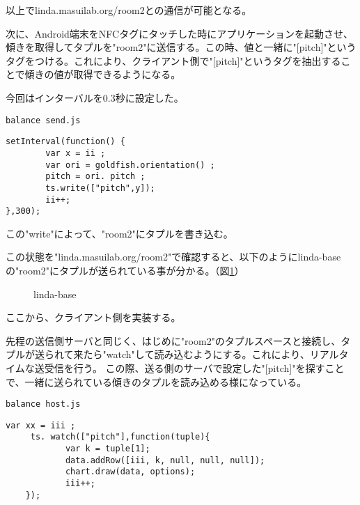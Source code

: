 \hspace{30mm} 

以上でlinda.masuilab.org/room2との通信が可能となる。


次に、Android端末をNFCタグにタッチした時にアプリケーションを起動させ、傾きを取得してタプルを"room2"に送信する。この時、値と一緒に"[pitch]"というタグをつける。これにより、クライアント側で"[pitch]"というタグを抽出することで傾きの値が取得できるようになる。

今回はインターバルを0.3秒に設定した。


\begin{itembox}[l]{{\tt balance send.js}}
\begin{verbatim}
setInterval(function() {
        var x = ii ;
        var ori = goldfish.orientation() ;
        pitch = ori. pitch ;
        ts.write(["pitch",y]); 
        ii++;
},300); 
\end{verbatim}
\end{itembox}

\hspace{30mm}

この"write"によって、"room2"にタプルを書き込む。

この状態を"linda.masuilab.org/room2"で確認すると、以下のようにlinda-baseの"room2"にタプルが送られている事が分かる。（図\ref{fig:08}）
\hspace{30mm}

\begin{figure}[htbp]
    \begin{center}
    \end{center}
    \caption{linda-base}
    \label{fig:08}
\end{figure}




ここから、クライアント側を実装する。

先程の送信側サーバと同じく、はじめに"room2"のタプルスペースと接続し、タプルが送られて来たら"watch"して読み込むようにする。これにより、リアルタイムな送受信を行う。
この際、送る側のサーバで設定した"[pitch]"を探すことで、一緒に送られている傾きのタプルを読み込める様になっている。


\begin{itembox}[l]{{\tt balance host.js}}
\begin{verbatim}
var xx = iii ;
     ts. watch(["pitch"],function(tuple){
            var k = tuple[1];
            data.addRow([iii, k, null, null, null]);
            chart.draw(data, options);
            iii++;
    });
\end{verbatim}
\end{itembox}


